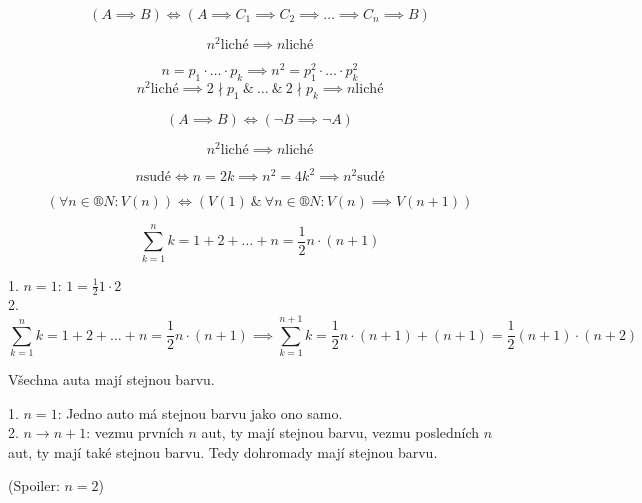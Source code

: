 \documentclass[12pt]{article}					%
\begin{document}
        \begin{definice}
                $$ (A \implies B) \Leftrightarrow (A \implies C_1 \implies C_2 \implies … \implies C_n \implies B) $$ 
            \begin{prikladyin}
                $$ n^2 \text{liché} \implies n \text{liché} $$
                \begin{dukazin}
                    $$ n = p_1 \cdot … \cdot p_k \implies n^2 = p_1^2 \cdot … \cdot p_k^2 $$
                    $$ n^2 \text{liché} \implies 2\nmid p_1\ \&\ …\ \&\ 2\nmid p_k \implies n \text{liché} $$ 
                \end{dukazin}
            \end{prikladyin}
        \end{definice}

        \begin{definice}
            $$ (A \implies B) \Leftrightarrow (\neg B \implies \neg A) $$
            \begin{prikladyin}
                $$ n^2 \text{liché} \implies n \text{liché} $$ 
                \begin{dukazin}
                    $$ n \text{sudé} \Leftrightarrow n = 2k \implies n^2 = 4k^2 \implies n^2 \text{sudé} $$         
                \end{dukazin}
            \end{prikladyin}
        \end{definice}

        \begin{definice}
            $$ (\forall n \in ®N: V(n)) \Leftrightarrow (V(1)\ \&\ \forall n \in ®N: V(n) \implies V(n+1)) $$ 
            \begin{prikladyin}
                $$ \sum_{k=1}^n k = 1+2+…+n = \frac{1}{2}n\cdot(n+1) $$
                \begin{dukaz}
                    1. $n = 1$: $1 = \frac{1}{2}1 \cdot 2$\\
                    2. 
                    $$ \sum_{k=1}^n k = 1+2+…+n = \frac{1}{2}n\cdot(n+1) \implies \sum_{k=1}^{n+1} k = \frac{1}{2}n\cdot(n+1) + (n + 1) = \frac{1}{2}(n+1)\cdot(n+2) $$ 
                \end{dukaz}
            \end{prikladyin}
            
            \begin{prikladin}
                Všechna auta mají stejnou barvu.
                \begin{dukazin}
                    1. $n = 1$: Jedno auto má stejnou barvu jako ono samo.\\
                    2. $n \rightarrow n+1$: vezmu prvních $n$ aut, ty mají stejnou barvu, vezmu posledních $n$ aut, ty mají také stejnou barvu. Tedy dohromady mají stejnou barvu.
                \end{dukazin}
                (Spoiler: $n = 2$)
            \end{prikladin}
        \end{definice}
\end{document}
